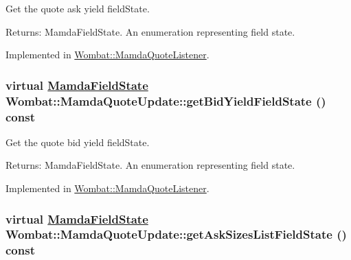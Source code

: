 Get the quote ask yield field\-State. 

\begin{Desc}
\item[Returns:]Mamda\-Field\-State. An enumeration representing field state. \end{Desc}


Implemented in \hyperlink{classWombat_1_1MamdaQuoteListener_94700f1e9995a69f5005efce5dc368d1}{Wombat::Mamda\-Quote\-Listener}.\hypertarget{classWombat_1_1MamdaQuoteUpdate_3f5d0b6f16d212b531345f64d6a37129}{
\subsubsection[getBidYieldFieldState]{\setlength{\rightskip}{0pt plus 5cm}virtual \hyperlink{namespaceWombat_93aac974f2ab713554fd12a1fa3b7d2a}{Mamda\-Field\-State} Wombat::Mamda\-Quote\-Update::get\-Bid\-Yield\-Field\-State () const}}
\label{classWombat_1_1MamdaQuoteUpdate_3f5d0b6f16d212b531345f64d6a37129}


Get the quote bid yield field\-State. 

\begin{Desc}
\item[Returns:]Mamda\-Field\-State. An enumeration representing field state. \end{Desc}


Implemented in \hyperlink{classWombat_1_1MamdaQuoteListener_fbf8ab1785c570733df4e0790947e489}{Wombat::Mamda\-Quote\-Listener}.\hypertarget{classWombat_1_1MamdaQuoteUpdate_b76f1d1d4a835b6119d09549699ed243}{
\subsubsection[getAskSizesListFieldState]{\setlength{\rightskip}{0pt plus 5cm}virtual \hyperlink{namespaceWombat_93aac974f2ab713554fd12a1fa3b7d2a}{Mamda\-Field\-State} Wombat::Mamda\-Quote\-Update::get\-Ask\-Sizes\-List\-Field\-State () const}}
\label{classWombat_1_1MamdaQuoteUpdate_b76f1d1d4a835b6119d09549699ed243}


